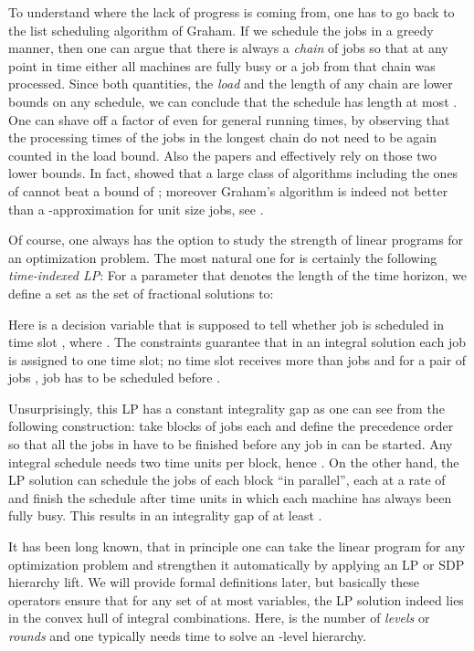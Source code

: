 \documentclass[11pt,letterpaper,oneside,english]{article}
\theoremstyle{theorem}
\begin{document}
To understand where the lack of progress is coming from, one has to go back to the 
list scheduling algorithm of Graham. If we schedule the jobs in a greedy manner, then one can argue 
that there is always a \emph{chain} of jobs  so that at any point in time
either all  machines are fully busy or a job from that chain was processed. Since both quantities, 
the \emph{load}  and the length of any chain are lower bounds on any
schedule, we can conclude that the schedule has length at most . 
One can shave off a factor of  even for general running times, by observing that the 
processing times of the 
jobs in the longest chain do not need to be again counted in the load bound. 
Also the papers \cite{TwoSchedulingAlgorithms-Lam-Sethi-SICOMP77} and \cite{PrecedenceConstrainedScheduling-GangalRanade2008} effectively rely on those two lower bounds. 
In fact, \cite{TechReportCharikar1995} showed that a large class of algorithms including the
ones of \cite{Graham66,PrecedenceConstrainedScheduling-GangalRanade2008} cannot beat 
a bound of ; moreover Graham's algorithm is indeed not better than
a -approximation for unit size jobs, see \cite{PrecedenceConstrainedScheduling-GangalRanade2008}.


Of course, one always has the option to study the strength of linear programs for an optimization problem.
The most natural one for  is certainly the following
\emph{time-indexed LP}: 
For a parameter  that denotes the length of the time horizon, we define a set  as the set of fractional solutions to:

Here  is a decision variable that is supposed to tell whether job  is scheduled in 
time slot , where . The constraints guarantee that in an integral solution each job is assigned
to one time slot; no time slot receives more than  jobs and for a pair of jobs , job 
has to be scheduled before . 


Unsurprisingly, this LP has a constant integrality gap as one can see from the following construction: 
take  blocks  of  jobs each and define the precedence order so
that all the jobs in  have to be finished before any job in  can be started. 
Any integral schedule needs two time units per block, hence . On the other hand, the LP
solution can schedule the  jobs of each block ``in parallel'', each at a rate of 
and finish the schedule after  time units in which each machine has always
been fully busy. This results in an integrality gap of at least .

It has been long known, that in principle one can take the linear program for any optimization problem and 
strengthen it automatically by applying an LP or SDP hierarchy lift.
We will provide formal definitions later, but basically these operators ensure that for any
set of at most  variables, the LP solution indeed lies in the convex hull of integral combinations.
Here,  is the number of \emph{levels} or \emph{rounds} and one typically needs
time  to solve an -level hierarchy.
\end{document}
